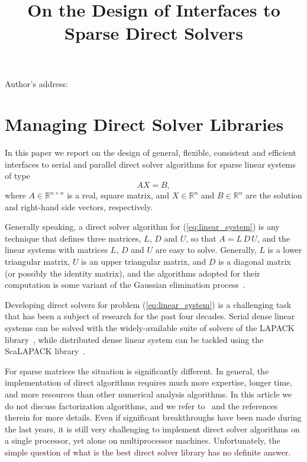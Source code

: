 \documentclass[acmtocl]{acmtrans2m}
\title{On the Design of Interfaces to Sparse Direct Solvers}
\author{}
\begin{document}
\setcounter{page}{1}

\begin{bottomstuff}
Author's address: 
\end{bottomstuff}

\maketitle

\section{Managing Direct Solver Libraries}
\label{sec:introduction}

In this paper we report on the design of general, flexible, consistent and
efficient interfaces to serial and parallel direct solver algorithms for
sparse linear systems of type
\begin{equation}
  \label{eq:linear_system}
  A X = B,
\end{equation}
where $A \in \mathbb{R}^{n \times n}$ is a real, square matrix, 
  and $X \in \mathbb{R}^{n}$ and $B \in \mathbb{R}^{n}$  are the solution and
right-hand side vectors, respectively. 

Generally speaking,
a direct solver algorithm for (\ref{eq:linear_system}) is any 
technique that defines three matrices, $L$, $D$ and $U$, so that
$A = L \, D \, U$, and the linear systems with matrices $L$, $D$ and $U$ are
easy to solve. Generally, $L$ is a lower triangular matrix, $U$ is an
upper triangular matrix, and $D$ is a diagonal matrix 
(or possibly the identity matrix), and the algorithms adopted for their
computation is some variant of the Gaussian elimination
process~\cite{xxx}. 

Developing direct solvers for problem (\ref{eq:linear_system}) is a
challenging task that has been a subject of research for the
past four decades. Serial dense linear systems can be solved with the
widely-available suite of solvers of the LAPACK
library~\cite{lapack-guide}, while distributed dense linear system can be
tackled using the ScaLAPACK library~\cite{scalapack-guide}.

For sparse matrices the situation is significantly different.
In general, the implementation of direct algorithms
requires much more expertise, longer time, and more resources than other
numerical analysis algorithms.  In this article we do not discuss
factorization algorithms, and we refer
to~\cite{amestoy01analysis,gupta01recent} and the references therein for more
details.  
Even if significant breakthroughs have been made during the last years,
it is still very challenging to implement direct solver algorithms
on a single processor, yet alone on multiprocessor machines. 
Unfortunately, the simple question of what is the best direct solver library
has no definite answer.
\end{document}
